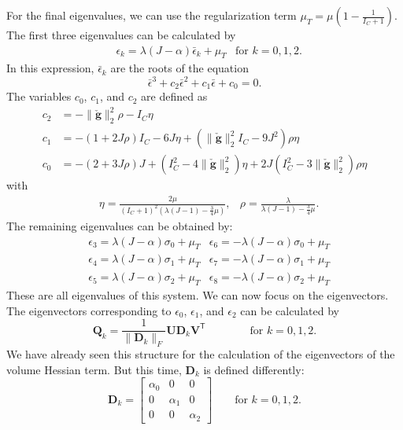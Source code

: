 {{{For the final eigenvalues, we can use the regularization term $\mu_T = \mu(1- \frac{1}{I_C +1})$. The first three eigenvalues can be calculated by
\begin{align*}
	&\epsilon_k = \lambda (J-\alpha) \bar{\epsilon}_k + \mu_T		&\text{for } k = 0, 1, 2.
\end{align*}	
In this expression, $\bar{\epsilon}_k$ are the roots of the equation
\[
	\bar{\epsilon}^3 + c_2 \bar{\epsilon}^2 + c_1 \bar{\epsilon} + c_0 = 0.
\]
The variables $c_0$, $c_1$, and $c_2$ are defined as
\begin{align*}
	c_2 &= - \|\mathbf{\check{g}}\|^2_2 \rho - I_C \eta \\
	c_1 &= - (1+ 2J\rho)I_C - 6 J \eta + \left( \|\mathbf{\check{g}}\|^2_2 I_C - 9J^2 \right) \rho \eta	\\
	c_0 &= - (2 +3J\rho)J + \left( I_C^2 - 4 \|\mathbf{\check{g}}\|^2_2 \right) \eta + 2J \left( I^2_C -3 \|\mathbf{\check{g}}\|^2_2 \right) \rho \eta 
\end{align*}
with 
\begin{align*}
	&\eta = \frac{2\mu}{(I_C+1)^2 \left( \lambda (J-1) - \frac{3}{4}\mu \right)}	,	&\rho = \frac{\lambda}{\lambda (J-1) - \frac{3}{4} \mu}.
\end{align*}
The remaining eigenvalues can be obtained by:
\begin{align*}
	&\epsilon_3 = \lambda(J-\alpha)\sigma_0 + \mu_T	
	&\epsilon_6 = -\lambda (J-\alpha)\sigma_0 + \mu_T \\
	&\epsilon_4 = \lambda(J-\alpha)\sigma_1 + \mu_T	
	&\epsilon_7 = -\lambda (J-\alpha)\sigma_1 + \mu_T \\
	&\epsilon_5 = \lambda(J-\alpha)\sigma_2 + \mu_T	
	&\epsilon_8 = -\lambda (J-\alpha)\sigma_2 + \mu_T
\end{align*}
These are all eigenvalues of this system. We can now focus on the eigenvectors. The eigenvectors corresponding to $\epsilon_0$, $\epsilon_1$, and $\epsilon_2$ can be calculated by
\[
\mathbf{Q}_k = \frac{1}{\| \mathbf{D}_k \|_{F}} \mathbf{U} \mathbf{D}_k \mathbf{V}^\mathsf{T} \qquad \qquad \text{for } k = 0, 1, 2.
\]
We have already seen this structure for the calculation of the eigenvectors of the volume Hessian term. But this time, $\mathbf{D}_k$ is defined differently:
\[
\mathbf{D}_k = \left[ \begin{matrix}
\alpha_0 & 0 & 0 \\ 0 & \alpha_1 & 0 \\ 0 & 0 & \alpha_2 \end{matrix} \right] \qquad \text{for } k = 0, 1, 2.
\]}}}
